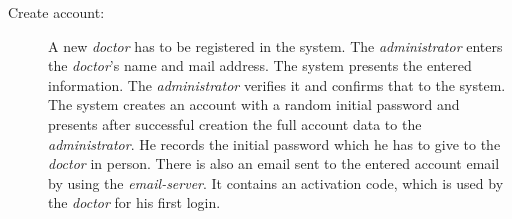 \documentclass[fontsize=12pt,
               paper=a4,
               twoside=false,
               parskip=half,
               ]{scrartcl}
\begin{document}
\begin{description}

\item[Create account:] A new \emph{doctor} has to be registered in the system. The \emph{administrator} enters the \emph{doctor}'s name and mail address. The system presents the entered information. The \emph{administrator} verifies it and confirms that to the system. The system creates an account with a random initial password and presents after successful creation the full account data to the \emph{administrator}. He records the initial password which he has to give to the \emph{doctor} in person. There is also an email sent to the entered account email by using the \emph{email-server}. It contains an activation code, which is used by the \emph{doctor} for his first login.






\end{description}
\end{document}
